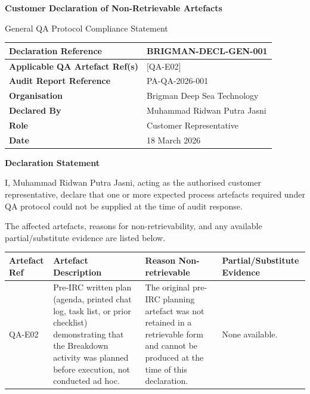 \documentclass[11pt,a4paper]{article}
\begin{document}
\begin{center}
\LARGE\textbf{Customer Declaration of Non-Retrievable Artefacts}

\vspace{0.3cm}
\large General QA Protocol Compliance Statement
\end{center}

\vspace{0.4cm}

\renewcommand{\arraystretch}{1.45}
\begin{tabularx}{\textwidth}{|p{}|X|}
\hline
\rowcolor{tableheader}
\textbf{Declaration Reference} & BRIGMAN-DECL-GEN-001 \\
\hline
\textbf{Applicable QA Artefact Ref(s)} & [QA-E02] \\
\hline
\textbf{Audit Report Reference} & PA-QA-2026-001 \\
\hline
\textbf{Organisation} & Brigman Deep Sea Technology \\
\hline
\textbf{Declared By} & Muhammad Ridwan Putra Jasni \\
\hline
\textbf{Role} & Customer Representative \\
\hline
\textbf{Date} & 18 March 2026 \\
\hline
\end{tabularx}

\vspace{0.5cm}

\noindent\textbf{Declaration Statement}

\vspace{0.2cm}

\noindent I, Muhammad Ridwan Putra Jasni, acting as the authorised customer representative, declare that one or more expected process artefacts required under QA protocol could not be supplied at the time of audit response.

\vspace{0.2cm}

\noindent The affected artefacts, reasons for non-retrievability, and any available partial/substitute evidence are listed below.

\vspace{0.3cm}

\renewcommand{\arraystretch}{1.45}
\begin{tabularx}{\textwidth}{|p{}|p{}|X|p{}|}
\hline
\rowcolor{tableheader}
\textbf{Artefact Ref} & \textbf{Artefact Description} & \textbf{Reason Non-retrievable} & \textbf{Partial/Substitute Evidence} \\
\hline
QA-E02 & Pre-IRC written plan (agenda, printed chat log, task list, or prior checklist) demonstrating that the Breakdown activity was planned before execution, not conducted ad hoc. & The original pre-IRC planning artefact was not retained in a retrievable form and cannot be produced at the time of this declaration. & None available. \\
\hline
\end{tabularx}
\end{document}
